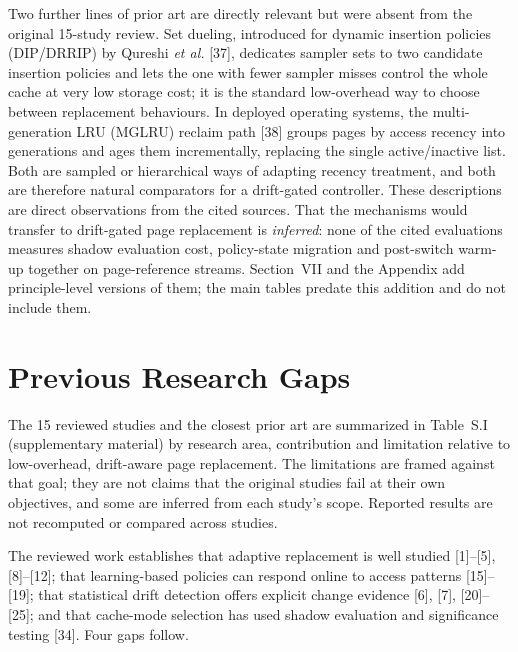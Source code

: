 \documentclass[10pt,twocolumn,a4paper]{IEEEtran}
\begin{document}
Two further lines of prior art are directly relevant but were absent from the
original 15-study review. Set dueling, introduced for dynamic insertion
policies (DIP/DRRIP) by Qureshi \emph{et al.} [37], dedicates sampler sets to
two candidate insertion policies and lets the one with fewer sampler misses
control the whole cache at very low storage cost; it is the standard
low-overhead way to choose between replacement behaviours. In deployed
operating systems, the multi-generation LRU (MGLRU) reclaim path [38] groups
pages by access recency into generations and ages them incrementally, replacing
the single active/inactive list. Both are sampled or hierarchical ways of
adapting recency treatment, and both are therefore natural comparators for a
drift-gated controller. These descriptions are direct observations from the
cited sources. That the mechanisms would transfer to drift-gated page
replacement is \emph{inferred}: none of the cited evaluations measures shadow
evaluation cost, policy-state migration and post-switch warm-up together on
page-reference streams. Section~VII and the Appendix add principle-level
versions of them; the main tables predate this addition and do not include
them.

\section{Previous Research Gaps}
\label{sec:gaps}

The 15 reviewed studies and the closest prior art are summarized in Table~S.I
(supplementary material) by research area, contribution and limitation relative
to low-overhead, drift-aware page replacement. The limitations are framed
against that goal; they are not claims that the original studies fail at their
own objectives, and some are inferred from each study's scope. Reported
results are not recomputed or compared across studies.



The reviewed work establishes that adaptive replacement is well studied
[1]--[5], [8]--[12]; that learning-based policies can respond online to
access patterns [15]--[19]; that statistical drift detection offers explicit
change evidence [6], [7], [20]--[25]; and that cache-mode selection has used
shadow evaluation and significance testing [34]. Four gaps follow.
\end{document}
